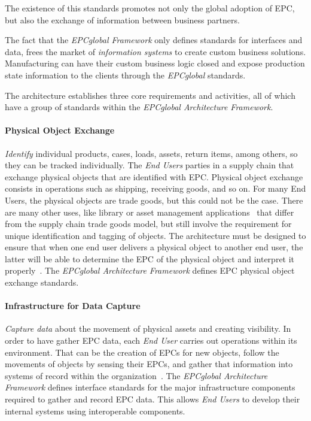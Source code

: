 The existence of this standards promotes not only the global adoption of \gls{EPC}, but also the exchange of information between business partners. 

The fact that the \emph{EPCglobal Framework} only defines standards for interfaces and data, frees the market of \emph{information systems} to create custom business solutions. Manufacturing can have their custom business logic closed and expose production state information to the clients through the \emph{EPCglobal} standards.

The architecture establishes three core requirements and activities, all of which have a group of standards within the \emph{EPCglobal Architecture Framework}.

\paragraph{Physical Object Exchange} 

\emph{Identify} individual products, cases, loads, assets, return items, among others, so they can be tracked individually.
The \emph{End Users} parties in a supply chain that exchange physical objects that are identified with \gls{EPC}.
Physical object exchange consists in operations such as shipping, receiving goods, and so on.
For many End Users, the physical objects are trade goods, but this could not be the case.
There are many other uses, like library or asset management applications~\cite{dong-yingliDesignInternetThings2016} that differ from the \gls{supply chain} trade goods model, but still involve the requirement for unique identification and tagging of objects. 
The architecture must be designed to ensure that when one end user delivers a physical object to another end user, the latter will be able to determine the \gls{EPC} of the physical object and interpret it properly~\cite{Architecture6framework20140414Pdf}.
The \emph{EPCglobal Architecture Framework} defines \gls{EPC} physical object exchange standards.

\paragraph{Infrastructure for Data Capture} 

\emph{Capture data} about the movement of physical assets and creating visibility.
In order to have gather \gls{EPC} data, each \emph{End User} carries out operations within its environment. That can be the creation of \gls{EPC}s for new objects, follow the movements of objects by sensing their \gls{EPC}s, and gather that information into systems of record within the organization~\cite{Architecture6framework20140414Pdf}. The \emph{EPCglobal Architecture Framework} defines interface standards for the major infrastructure components required to gather and record \gls{EPC} data. This allows \emph{End Users} to develop their internal systems using interoperable components.

